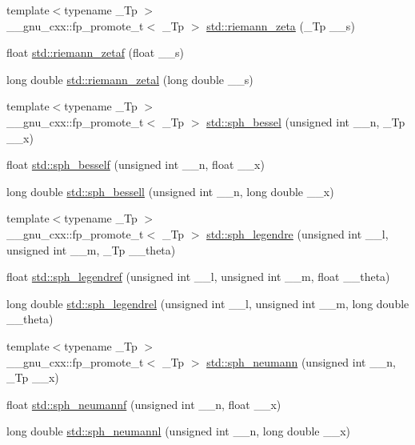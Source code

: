 \begin{DoxyCompactItemize}
\item 
{\footnotesize template$<$typename \+\_\+\+Tp $>$ }\\\+\_\+\+\_\+gnu\+\_\+cxx\+::fp\+\_\+promote\+\_\+t$<$ \+\_\+\+Tp $>$ \hyperlink{group__tr29124__math__spec__func_gac4ef9d52ee583c77937c3a420b7c72ca}{std\+::riemann\+\_\+zeta} (\+\_\+\+Tp \+\_\+\+\_\+s)
\item 
float \hyperlink{group__tr29124__math__spec__func_gaf92063315061a56d3e2c4053156d968e}{std\+::riemann\+\_\+zetaf} (float \+\_\+\+\_\+s)
\item 
long double \hyperlink{group__tr29124__math__spec__func_ga1e92da3b878d75270f38d3ec9b513086}{std\+::riemann\+\_\+zetal} (long double \+\_\+\+\_\+s)
\item 
{\footnotesize template$<$typename \+\_\+\+Tp $>$ }\\\+\_\+\+\_\+gnu\+\_\+cxx\+::fp\+\_\+promote\+\_\+t$<$ \+\_\+\+Tp $>$ \hyperlink{group__tr29124__math__spec__func_gad125841d7c85e461cb8954952e3a17c8}{std\+::sph\+\_\+bessel} (unsigned int \+\_\+\+\_\+n, \+\_\+\+Tp \+\_\+\+\_\+x)
\item 
float \hyperlink{group__tr29124__math__spec__func_ga534e36e1dcefad8daec98920db16eec4}{std\+::sph\+\_\+besself} (unsigned int \+\_\+\+\_\+n, float \+\_\+\+\_\+x)
\item 
long double \hyperlink{group__tr29124__math__spec__func_ga11d72b1af81ce9da3c878a25087ee927}{std\+::sph\+\_\+bessell} (unsigned int \+\_\+\+\_\+n, long double \+\_\+\+\_\+x)
\item 
{\footnotesize template$<$typename \+\_\+\+Tp $>$ }\\\+\_\+\+\_\+gnu\+\_\+cxx\+::fp\+\_\+promote\+\_\+t$<$ \+\_\+\+Tp $>$ \hyperlink{group__tr29124__math__spec__func_gacef0d41a7ce572a9ace3437498794ed0}{std\+::sph\+\_\+legendre} (unsigned int \+\_\+\+\_\+l, unsigned int \+\_\+\+\_\+m, \+\_\+\+Tp \+\_\+\+\_\+theta)
\item 
float \hyperlink{group__tr29124__math__spec__func_gaae635d28c06a3be2679901b382090852}{std\+::sph\+\_\+legendref} (unsigned int \+\_\+\+\_\+l, unsigned int \+\_\+\+\_\+m, float \+\_\+\+\_\+theta)
\item 
long double \hyperlink{group__tr29124__math__spec__func_ga2f6618dea1847f09fd67f3c974c1910d}{std\+::sph\+\_\+legendrel} (unsigned int \+\_\+\+\_\+l, unsigned int \+\_\+\+\_\+m, long double \+\_\+\+\_\+theta)
\item 
{\footnotesize template$<$typename \+\_\+\+Tp $>$ }\\\+\_\+\+\_\+gnu\+\_\+cxx\+::fp\+\_\+promote\+\_\+t$<$ \+\_\+\+Tp $>$ \hyperlink{group__tr29124__math__spec__func_ga01cdd716aaca8ff3c08f307800fd5220}{std\+::sph\+\_\+neumann} (unsigned int \+\_\+\+\_\+n, \+\_\+\+Tp \+\_\+\+\_\+x)
\item 
float \hyperlink{group__tr29124__math__spec__func_ga789143122fa99536329bc2d1b1aac2f0}{std\+::sph\+\_\+neumannf} (unsigned int \+\_\+\+\_\+n, float \+\_\+\+\_\+x)
\item 
long double \hyperlink{group__tr29124__math__spec__func_ga3cededa9b6e4601f190c3811e6aabfd6}{std\+::sph\+\_\+neumannl} (unsigned int \+\_\+\+\_\+n, long double \+\_\+\+\_\+x)
\end{DoxyCompactItemize}


